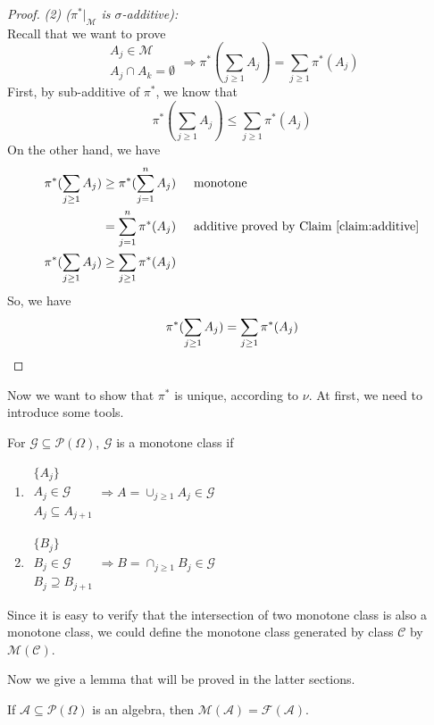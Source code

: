 \begin{proof}
  \emph{(2) ($\pi^*|_{\mathcal{M}}$ is $\sigma$-additive):} \\
  Recall that we want to prove
  \[\substack{A_j\in\mathcal{M}\\A_j\cap A_k = \emptyset} \Rightarrow \pi^*(\sum_{j\geq 1} A_j) = \sum_{j\geq 1} \pi^*(A_j)\]
  First, by sub-additive of $\pi^*$, we know that
  \[\pi^*(\sum_{j\geq 1} A_j) \leq \sum_{j\geq 1} \pi^*(A_j)\]
  On the other hand, we have
  \begin{align*}
    \pi^*(\sum_{j\geq 1} A_j) &\geq \pi^*(\sum_{j=1}^n A_j) \hspace{0.5cm} \mbox{monotone} \\
    &= \sum_{j=1}^n \pi^*(A_j) \hspace{0.5cm} \mbox{additive proved by Claim \ref{claim:additive}} \\
    \pi^*(\sum_{j\geq 1} A_j) &\geq \sum_{j\geq 1} \pi^*(A_j)
  \end{align*}
  So, we have 
  \[\pi^*(\sum_{j\geq 1} A_j) = \sum_{j\geq 1} \pi^*(A_j) \qedhere\]
\end{proof}

Now we want to show that $\pi^*$ is unique, according to $\nu$.
At first, we need to introduce some tools.
\begin{define}
  For $\mathcal{G}\subseteq \mathcal{P}(\Omega)$,
  $\mathcal{G}$ is a monotone class if
  \begin{enumerate}
  \item $\substack{\{A_j\}\\A_j\in\mathcal{G}\\A_j\subseteq A_{j+1}} \Rightarrow A = \cup_{j\geq 1} A_j \in \mathcal{G}$
  \item $\substack{\{B_j\}\\B_j\in\mathcal{G}\\B_j\supseteq B_{j+1}} \Rightarrow B = \cap_{j\geq 1} B_j \in \mathcal{G}$
  \end{enumerate}
\end{define}
\begin{remark}
  Since it is easy to verify that the intersection of two monotone class is also a monotone class,
  we could define the monotone class generated by class $\mathcal{C}$ by $\mathcal{M}(\mathcal{C})$.
\end{remark}

Now we give a lemma that will be proved in the latter sections.
\begin{lemma}
  If $\mathcal{A} \subseteq \mathcal{P}(\Omega)$ is an algebra,
  then $\mathcal{M}(\mathcal{A}) = \mathcal{F}(\mathcal{A})$.
\end{lemma}

